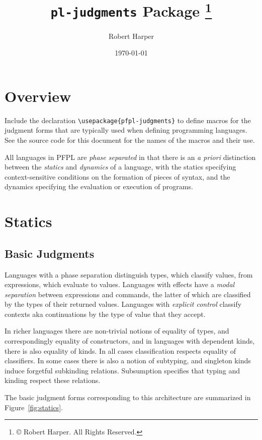 \documentclass[11pt]{article}
\title{\texttt{pl-judgments} Package%
\footnote{\copyright{} \the\year{} Robert Harper.  All Rights Reserved.}}
\author{Robert Harper}
\date{\today}
\begin{document}
\maketitle{}

\section*{Overview}

Include the declaration \verb|\usepackage{pfpl-judgments}| to define macros for the judgment forms that are typically used when defining programming languages.  See the source code for this document for the names of the macros and their use.

All languages in \textsf{PFPL} are \emph{phase separated} in that there is an \emph{a priori} distinction between the \emph{statics} and \emph{dynamics} of a language, with the statics specifying context-sensitive conditions on the formation of pieces of syntax, and the dynamics specifying the evaluation or execution of programs.

\section*{Statics}


\subsection*{Basic Judgments}

Languages with a phase separation distinguish types, which classify values, from expressions, which evaluate to values.  Languages with effects have a \emph{modal separation} between expressions and commands, the latter of which are classified by the types of their returned values.  Languages with \emph{explicit control} classify contexts aka continuations by the type of value that they accept.

In richer languages there are non-trivial notions of equality of types, and correspondingly equality of constructors, and in languages with dependent kinds, there is also equality of kinds.  In all cases classification respects equality of classifiers.  In some cases there is also a notion of subtyping, and singleton kinds induce forgetful subkinding relations.  Subsumption specifies that typing and kinding respect these relations.

The basic judgment forms corresponding to this architecture are summarized in Figure~\ref{fig:statics}.
\end{document}
